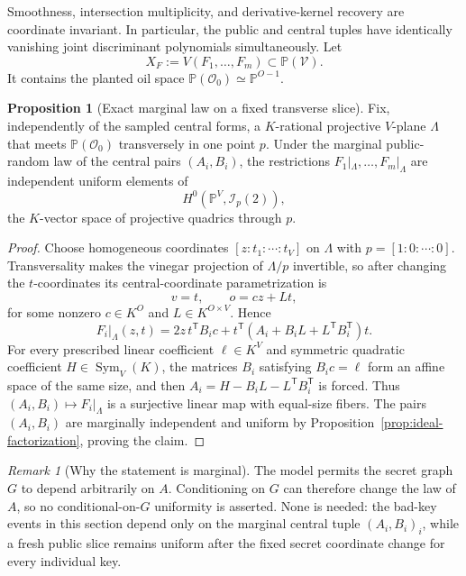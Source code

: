 \documentclass[11pt,a4paper]{article}
\theoremstyle{definition}
\newtheorem{proposition}[theorem]{Proposition}
\theoremstyle{remark}
\newtheorem{remark}[theorem]{Remark}
\newcommand{\PP}{\mathbb P}
\newcommand{\cO}{\mathcal O}
\newcommand{\cV}{\mathcal V}
\newcommand{\Sym}{\operatorname{Sym}}
\begin{document}
Smoothness, intersection multiplicity, and derivative-kernel recovery are coordinate invariant.  In particular, the public and central tuples have identically vanishing joint discriminant polynomials simultaneously.  Let
\[
X_F:=V(F_1,\ldots,F_m)\subset\PP(\cV).
\]
It contains the planted oil space $\PP(\cO_0)\simeq\PP^{O-1}$.

\begin{proposition}[Exact marginal law on a fixed transverse slice]\label{prop:planted-slice-law}
Fix, independently of the sampled central forms, a $K$-rational projective $V$-plane $\Lambda$ that meets $\PP(\cO_0)$ transversely in one point $p$.  Under the marginal public-random law of the central pairs $(A_i,B_i)$, the restrictions $F_1|_\Lambda,\ldots,F_m|_\Lambda$ are independent uniform elements of
\[
H^0\!\left(\PP^V,\mathcal I_p(2)\right),
\]
the $K$-vector space of projective quadrics through $p$.
\end{proposition}

\begin{proof}
Choose homogeneous coordinates $[z:t_1:\cdots:t_V]$ on $\Lambda$ with $p=[1:0:\cdots:0]$.  Transversality makes the vinegar projection of $\Lambda/p$ invertible, so after changing the $t$-coordinates its central-coordinate parametrization is
\[
v=t,\qquad o=cz+Lt,
\]
for some nonzero $c\in K^O$ and $L\in K^{O\times V}$.  Hence
\[
F_i|_\Lambda(z,t)
 =2z\,t^{\mathsf T}B_ic
  +t^{\mathsf T}\!\left(A_i+B_iL+L^{\mathsf T}B_i^{\mathsf T}\right)t.
\]
For every prescribed linear coefficient $\ell\in K^V$ and symmetric quadratic coefficient $H\in\Sym_V(K)$, the matrices $B_i$ satisfying $B_ic=\ell$ form an affine space of the same size, and then $A_i=H-B_iL-L^{\mathsf T}B_i^{\mathsf T}$ is forced.  Thus $(A_i,B_i)\mapsto F_i|_\Lambda$ is a surjective linear map with equal-size fibers.  The pairs $(A_i,B_i)$ are marginally independent and uniform by Proposition~\ref{prop:ideal-factorization}, proving the claim.
\end{proof}

\begin{remark}[Why the statement is marginal]\label{rem:slice-law-marginal}
The model permits the secret graph $G$ to depend arbitrarily on $A$.  Conditioning on $G$ can therefore change the law of $A$, so no conditional-on-$G$ uniformity is asserted.  None is needed: the bad-key events in this section depend only on the marginal central tuple $(A_i,B_i)_i$, while a fresh public slice remains uniform after the fixed secret coordinate change for every individual key.
\end{remark}
\end{document}
